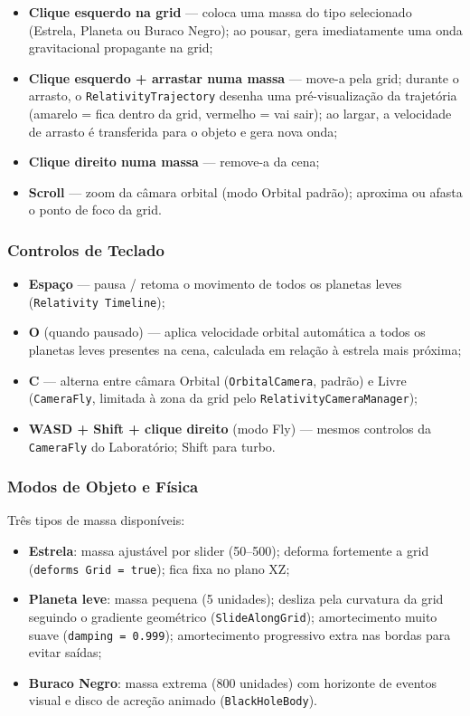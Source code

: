 \documentclass[12pt,a4paper]{article}
\begin{document}
\begin{itemize}
  \item \textbf{Clique esquerdo na grid} --- coloca uma massa do tipo selecionado (Estrela, Planeta ou Buraco Negro); ao pousar, gera imediatamente uma onda gravitacional propagante na grid;
  \item \textbf{Clique esquerdo + arrastar numa massa} --- move-a pela grid; durante o arrasto, o \texttt{RelativityTrajectory} desenha uma pr\'{e}-visualiza\c{c}\~{a}o da trajet\'{o}ria (amarelo = fica dentro da grid, vermelho = vai sair); ao largar, a velocidade de arrasto \'{e} transferida para o objeto e gera nova onda;
  \item \textbf{Clique direito numa massa} --- remove-a da cena;
  \item \textbf{Scroll} --- zoom da c\^{a}mara orbital (modo Orbital padr\~{a}o); aproxima ou afasta o ponto de foco da grid.
\end{itemize}

\subsubsection{Controlos de Teclado}

\begin{itemize}
  \item \textbf{Espa\c{c}o} --- pausa / retoma o movimento de todos os planetas leves (\texttt{Relativity\ Timeline});
  \item \textbf{O} (quando pausado) --- aplica velocidade orbital autom\'{a}tica a todos os planetas leves presentes na cena, calculada em rela\c{c}\~{a}o \`{a} estrela mais pr\'{o}xima;
  \item \textbf{C} --- alterna entre c\^{a}mara Orbital (\texttt{OrbitalCamera}, padr\~{a}o) e Livre (\texttt{CameraFly}, limitada \`{a} zona da grid pelo \texttt{RelativityCameraManager});
  \item \textbf{WASD + Shift + clique direito} (modo Fly) --- mesmos controlos da \texttt{CameraFly} do Laborat\'{o}rio; Shift para turbo.
\end{itemize}

\subsubsection{Modos de Objeto e F\'{i}sica}

Tr\^{e}s tipos de massa dispon\'{i}veis:
\begin{itemize}
  \item \textbf{Estrela}: massa ajust\'{a}vel por slider (50--500); deforma fortemente a grid (\texttt{deforms\ Grid = true}); fica fixa no plano XZ;
  \item \textbf{Planeta leve}: massa pequena (5 unidades); desliza pela curvatura da grid seguindo o gradiente geom\'{e}trico (\texttt{SlideAlongGrid}); amortecimento muito suave (\texttt{damping = 0.999}); amortecimento progressivo extra nas bordas para evitar sa\'{i}das;
  \item \textbf{Buraco Negro}: massa extrema (800 unidades) com horizonte de eventos visual e disco de acre\c{c}\~{a}o animado (\texttt{BlackHoleBody}).
\end{itemize}
\end{document}
